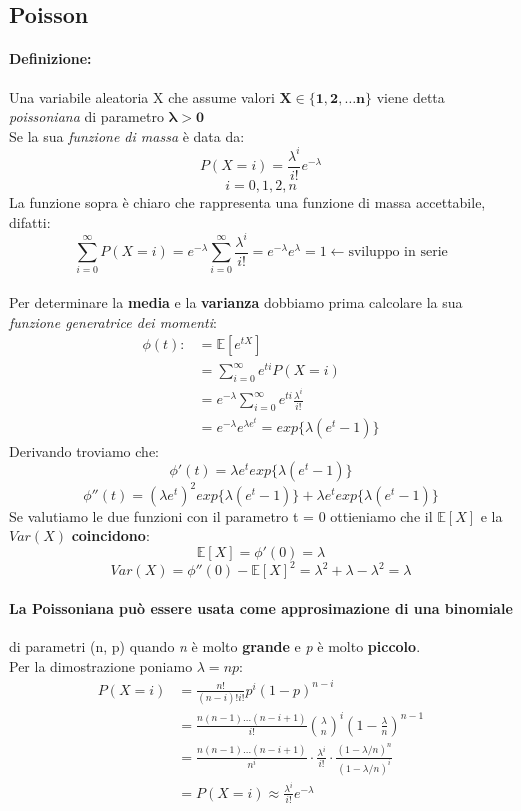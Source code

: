 \documentclass[]{article}
\newcommand{\ev}{\mathbb{E}[X]}
\renewcommand{\ev}[1]{\mathbb{E}[#1]}
\newcommand{\definizione}{\paragraph{Definizione:}}
\begin{document}
    \subsection{Poisson}
    \definizione Una variabile aleatoria X che assume valori $\boldsymbol{X \in \{1,2, \ldots n\}}$ viene detta \textit{poissoniana} di parametro $\boldsymbol{\lambda > 0}$ \\
    Se la sua \textit{funzione di massa} è data da:
    \[ P(X = i) = \frac{\lambda^i}{i!} e^{-\lambda} \]
    \[ i = 0,1,2,n \]
    La funzione sopra è chiaro che rappresenta una funzione di massa accettabile, difatti:
    \[ \sum_{i = 0}^{\infty} P(X = i) = e^{-\lambda} \sum_{i = 0}^{\infty} \frac{\lambda^i}{i!} = e^{-\lambda} e^\lambda = 1 \leftarrow \text{sviluppo in serie} \] \\ 
    Per determinare la \textbf{media} e la \textbf{varianza} dobbiamo prima calcolare la sua \textit{funzione generatrice dei momenti}:
    \begin{equation*}
        \begin{split}
            \phi (t) : & = \ev{e^{tX}} \\ 
            & = \sum_{i = 0}^{\infty} e^{ti} P(X = i) \\
            & = e^{-\lambda} \sum_{i = 0}^{\infty} e^{ti} \frac{\lambda^i}{i!} \\
            & = e^{-\lambda} e^{\lambda e^t} = exp\{\lambda(e^t - 1)\}
        \end{split}
    \end{equation*}
    Derivando troviamo che:
    \[ \phi'(t) = \lambda e^t exp\{\lambda(e^t - 1) \} \]
    \[ \phi''(t) = (\lambda e^t)^2 exp\{\lambda(e^t - 1)\} + \lambda e^t exp\{\lambda(e^t - 1)\} \]
    Se valutiamo le due funzioni con il parametro t = 0 ottieniamo che il $\ev{X}$ e la $Var(X)$ \textbf{coincidono}:
    \[ \ev{X} = \phi'(0) = \lambda \]
    \[ Var(X) = \phi''(0) - \ev{X}^2 = \lambda^2 + \lambda - \lambda^2 = \lambda \]

    \paragraph{La Poissoniana può essere usata come approsimazione di una binomiale} di parametri (n, p) quando \textit{n} è molto \textbf{grande} 
    e \textit{p} è molto \textbf{piccolo}. \\
    Per la dimostrazione poniamo $\lambda = np$:
    \begin{equation*}
        \begin{split}
            P(X = i) &= \frac{n!}{(n-i)! i!} p^i (1-p)^{n-i} \\
            & = \frac{n(n-1) \ldots (n-i+1)}{i!} \binom{\lambda}{n}^i (1 - \frac{\lambda}{n})^{n-1} \\
            & = \frac{n(n-1) \ldots (n-i+1)}{n^i} \cdot \frac{\lambda^i}{i!} \cdot \frac{(1 - \lambda / n)^n}{(1 - \lambda/n)^i} \\
            & = P(X = i) \approx \frac{\lambda^i}{i!} e^{-\lambda}
        \end{split}
    \end{equation*}
\end{document}
